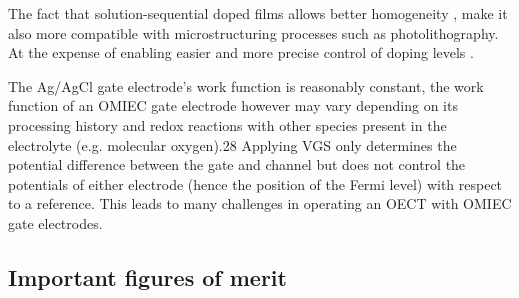 The fact that solution-sequential doped films allows better homogeneity \cite{jacobsComparisonSolutionmixedSequentially2016}, make it also more compatible with microstructuring processes such as photolithography. At the expense of enabling easier and more precise control of doping levels \cite{tanOrganicMixedIonic2022}.

The Ag/AgCl gate electrode’s work function is reasonably constant, the work function of an OMIEC gate electrode however may vary depending on its processing history and redox reactions with other species present in the electrolyte (e.g. molecular oxygen).28 Applying VGS only determines the potential difference between the gate and channel but does not control the potentials of either electrode (hence the position of the Fermi level) with respect to a reference. This leads to many challenges in operating an OECT with OMIEC gate electrodes.


\subsection{Important figures of merit}



